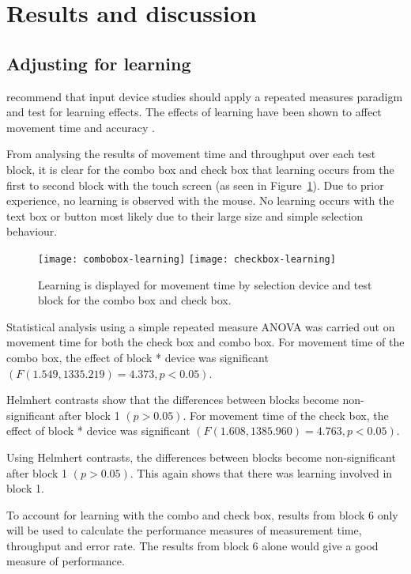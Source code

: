 \documentclass{elsart}
\begin{document}
\section{Results and discussion}
\label{sec-results}

\subsection{Adjusting for learning}
\label{sec-results-learning}

\citet{Doug-SA-1999-CHI} recommend that input device studies should
apply a repeated measures paradigm and test for learning effects. The
effects of learning have been shown to affect movement time and accuracy
\citep{Doug-SA-1999-CHI}.

From analysing the results of movement time and throughput over each
test block, it is clear for the combo box and check box that learning
occurs from the first to second block with the touch screen (as seen in
Figure~\ref{fig-movement-time-learning}). Due to prior experience, no
learning is observed with the mouse. No learning occurs with the text
box or button most likely due to their large size and simple selection
behaviour.

\begin{figure}
	\centering
	\texttt{[image: combobox-learning]}
	\texttt{[image: checkbox-learning]}
	\caption{Learning is displayed for movement time by selection device
	and test block for the combo box and check box.}
	\label{fig-movement-time-learning}
\end{figure}

Statistical analysis using a simple repeated measure ANOVA was carried
out on movement time for both the check box and combo box. For movement
time of the combo box, the effect of block * device was significant
\((F(1.549, 1335.219) = 4.373, p < 0.05)\).

Helmhert contrasts show that the differences between blocks become
non-significant after block 1 \((p > 0.05)\). For movement time of the
check box, the effect of block * device was significant \((F(1.608,
1385.960) = 4.763, p < 0.05)\).

Using Helmhert contrasts, the differences between blocks become
non-significant after block 1 \((p > 0.05)\). This again shows that
there was learning involved in block 1.

To account for learning with the combo and check box, results from block
6 only will be used to calculate the performance measures of measurement
time, throughput and error rate. The results from block 6 alone would
give a good measure of performance.
\end{document}
